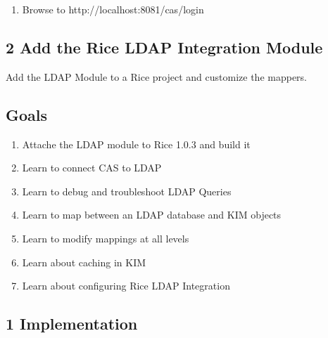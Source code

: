 \begin{enumerate}
\begin{lstlisting}[numbers=left,language=xml,basicstyle=\scriptsize,backgroundcolor=\color{ubergray},caption={src/main/resources/custom.properties},frame=single,breaklines=true]
       <param name="filter.validation.class">org.jasig.cas.client.validation.Cas20ProxyReceivingTicketValidationFilter</param>
       <param name="filter.validation.casServerUrlPrefix">${cas.url}</param>
       <param name="filter.validation.serverName">${application.host}:${http.port}</param>
       <param name="filtermapping.validation.2">/*</param>

       <param name="filter.caswrapper.class">org.jasig.cas.client.util.HttpServletRequestWrapperFilter</param>
       <param name="filtermapping.caswrapper.3">/*</param>
\end{lstlisting}
\item Browse to http://localhost:8081/cas/login


\end{enumerate}

\subsection*{2 Add the Rice LDAP Integration Module}
Add the LDAP Module to a Rice project and customize the mappers.

\subsection*{Goals}
\begin{enumerate}
  \item Attache the LDAP module to Rice 1.0.3 and build it
  \item Learn to connect CAS to LDAP
  \item Learn to debug and troubleshoot LDAP Queries
  \item Learn to map between an LDAP database and KIM objects
  \item Learn to modify mappings at all levels
  \item Learn about caching in KIM
  \item Learn about configuring Rice LDAP Integration
\end{enumerate}

\subsection*{1 Implementation}
